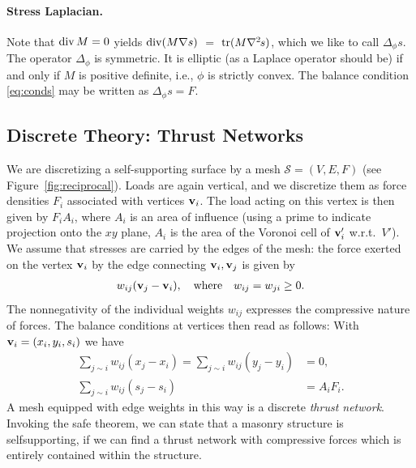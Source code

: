 \documentclass[review]{acmsiggraph}
\def\Div{\mathop{{\rm div}}\nolimits}
\def\tr{\mathop{{\rm tr}}\nolimits}
\def\ess{s}
\def\Hess#1{{\def\testess{#1}\nabla^2\ifx\testess\ess\!s\else #1\fi}}
\def\Hess#1{\text{$\nabla^2\hskip-.2ex #1$}}
\def\SS{{\mathcal S}}
\begin{document}
\paragraph{Stress Laplacian.} Note that $\Div M =0$ yields $\Div(M\nabla 
s)$ $ =$ $ \tr(M\Hess s)$, which we like to call $\Delta_\phi s$. The 
operator $\Delta_\phi$ is symmetric. It is elliptic (as a Laplace operator 
should be) if and only if $M$ is positive definite, i.e., $\phi$ is 
strictly convex. The balance condition \eqref{eq:conds} may be written as
	$
	\Delta_\phi s = F.
	$


\subsection{Discrete Theory: Thrust Networks}
\label{sec:thrustnetworks}

We are discretizing a self-supporting surface by a mesh $\SS=(V,E,F)$
(see Figure~\ref{fig:reciprocal}). Loads are again vertical, 
and we discretize them as force densities $F_i$ associated with vertices 
${\mathbf v}_i$. The load acting on this vertex is then given by $F_iA_i$, where 
$A_i$ is an area of influence (using a prime to indicate projection onto 
the $xy$ plane, $A_i$ is the area of the Voronoi cell of ${\mathbf v}_i'$ w.r.t.\ 
$V'$). We assume that stresses are carried by the edges of the mesh: the 
force exerted on the vertex ${\mathbf v}_i$ by the edge connecting ${\mathbf v}_i,{\mathbf v}_j$ 
is given by
	\begin{align*}
	w_{ij} ({\mathbf v}_j-{\mathbf v}_i),
	\quad
	\text{where}\quad
	w_{ij}=w_{ji}\ge 0.
	\end{align*}
 The nonnegativity of the individual weights $w_{ij}$ expresses the 
compressive nature of forces. The balance conditions at vertices then read 
as follows: With ${\mathbf v}_i=(x_i,y_i,s_i)$ we have
	\begin{align}
	\sum\nolimits_{j\sim i}
		w_{ij} (x_j - x_i)
	=
	\sum\nolimits_{j\sim i}
		w_{ij} (y_j - y_i) &= 0,
			 \label{eq:deqtop} \\
	\sum\nolimits_{j\sim i}
		w_{ij} (s_j - s_i)
		&= A_i F_i.
			\label{eq:deqz}
	\end{align}
 A mesh equipped with edge weights in this way is a discrete \emph{thrust
network}. Invoking the safe theorem, we can state that a masonry structure
is self\dash supporting, if we can find a thrust network with compressive
forces which is entirely contained within the structure.
\end{document}
